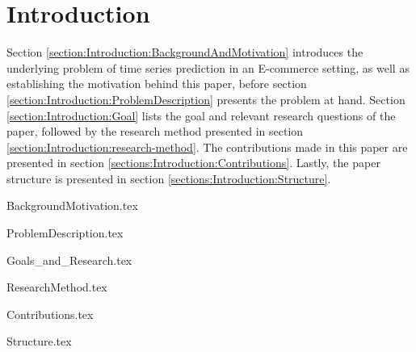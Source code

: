 \chapter{Introduction}
\label{cha:Introduction}

Section \ref{section:Introduction:BackgroundAndMotivation}
introduces the underlying problem of time series prediction in an E-commerce setting,
as well as establishing the motivation behind this paper,
before section \ref{section:Introduction:ProblemDescription}
presents the problem at hand.
Section \ref{section:Introduction:Goal} lists the goal and relevant research questions of the paper,
followed by the research method presented in section \ref{section:Introduction:research-method}.
The contributions made in this paper are presented in section \ref{sections:Introduction:Contributions}.
Lastly, the paper structure is presented in section \ref{sections:Introduction:Structure}.


\iffalse
  All chapters should begin with an introduction before any sections begin. Further, each sections begins with an introduction before  subsections begin. Chapters with just one section or sections with just one sub-section, should be avoided. Think carefully about chapter and section titles as each title stand alone in the table of contents (without associated text) and should convey meaning for the contents of the chapter or section.

  In all chapters and sections it is important to write clearly and concisely. Avoid repetitions and if needed, refer back to the original discussion or presentation. Each new section, subsection or paragraph should provide the reader with new information and be written in your own words. Avoid direct quotes. If you use direct quotes, unless the quote itself is very significant, you are conveying to the reader that you are unable to express this discussion or fact yourself. Such direct quotes also break the flow of the language (yours to someone else's).
\fi


{BackgroundMotivation.tex}

{ProblemDescription.tex}

{Goals_and_Research.tex}

{ResearchMethod.tex}

{Contributions.tex}

{Structure.tex}
